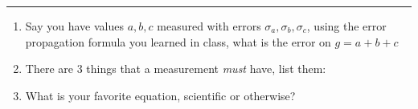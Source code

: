 \documentclass[11pt]{article}
\begin{document}
\Large

\medskip\hrule\bigskip\bigskip
{}
\begin{enumerate}

\item Say you have values $a,b,c$ measured with errors $\sigma_a,\sigma_b,\sigma_c$, using the error propagation formula you learned in class, what is the error on $g=a+b+c$
  \vspace*{0.27\textheight}
\item There are 3 things that a measurement \emph{must} have, list them:
  \vspace*{0.27\textheight}
\item What is your favorite equation, scientific or otherwise?
  
\end{enumerate}
\end{document}
